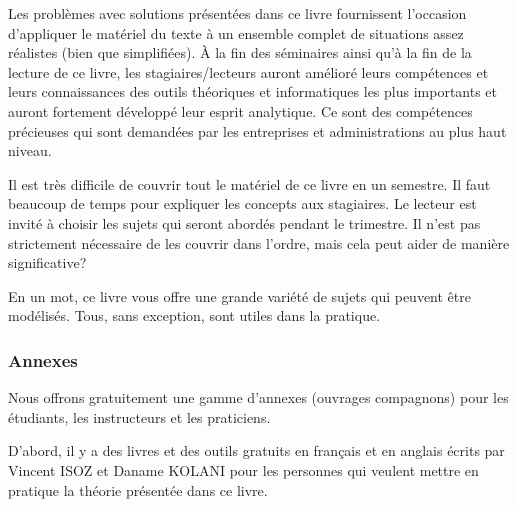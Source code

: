 	Les problèmes avec solutions présentées dans ce livre fournissent l'occasion d'appliquer le matériel du texte à un ensemble complet de situations assez réalistes (bien que simplifiées). À la fin des séminaires ainsi qu'à la fin de la lecture de ce livre, les stagiaires/lecteurs auront amélioré leurs compétences et leurs connaissances des outils théoriques et informatiques les plus importants et auront fortement développé leur esprit analytique. Ce sont des compétences précieuses qui sont demandées par les entreprises et administrations au plus haut niveau.

	Il est très difficile de couvrir tout le matériel de ce livre en un semestre. Il faut beaucoup de temps pour expliquer les concepts aux stagiaires. Le lecteur est invité à choisir les sujets qui seront abordés pendant le trimestre. Il n'est pas strictement nécessaire de les couvrir dans l'ordre, mais cela peut aider de manière significative?

	En un mot, ce livre vous offre une grande variété de sujets qui peuvent être modélisés. Tous, sans exception, sont utiles dans la pratique.
	
	\pagebreak
	\subsubsection{Annexes}
	Nous offrons gratuitement une gamme d'annexes (ouvrages compagnons) pour les étudiants, les instructeurs et les praticiens.
	
	D'abord, il y a des livres et des outils gratuits en français et en anglais écrits par Vincent ISOZ et Daname KOLANI pour les personnes qui veulent mettre en pratique la théorie présentée dans ce livre.
	
